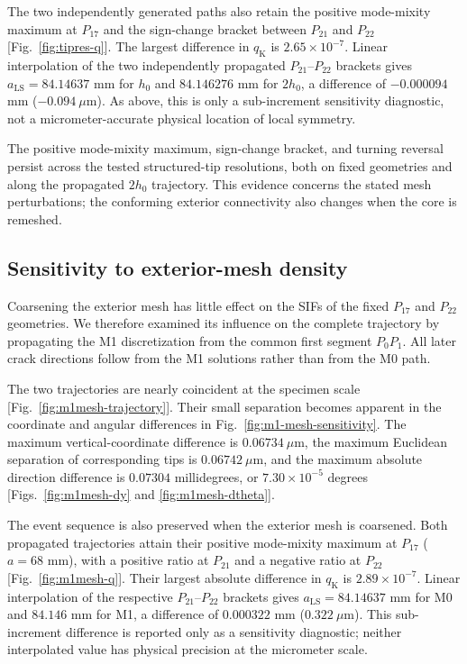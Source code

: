 \documentclass[11pt]{article}
\begin{document}
The two independently generated paths also retain the
positive mode-mixity maximum at $P_{17}$ and the sign-change
bracket between $P_{21}$ and $P_{22}$
[Fig.~\ref{fig:tipres-q}]. The largest difference
in $q_{\mathrm{K}}$ is $2.65\times10^{-7}$.
Linear interpolation of the two independently propagated
$P_{21}$--$P_{22}$ brackets gives
$a_{\mathrm{LS}}=84.14637$ mm for $h_0$ and
$84.146276$ mm for $2h_0$, a difference of
$-0.000094$ mm ($-0.094~\mu\mathrm{m}$). As above, this is only a
sub-increment sensitivity diagnostic, not a micrometer-accurate physical
location of local symmetry.

The positive mode-mixity maximum, sign-change bracket, and
turning reversal persist across the tested structured-tip
resolutions, both on fixed geometries and along the propagated
$2h_0$ trajectory. This evidence concerns the stated
mesh perturbations; the conforming exterior connectivity
also changes when the core is remeshed.

\subsection{Sensitivity to exterior-mesh density}
Coarsening the exterior mesh has little effect on the SIFs
of the fixed $P_{17}$ and $P_{22}$ geometries. We therefore
examined its influence on the complete trajectory by propagating
the M1 discretization from the common first segment $P_0P_1$.
All later crack directions follow from the M1 solutions
rather than from the M0 path.

The two trajectories are nearly coincident at the specimen scale
[Fig.~\ref{fig:m1mesh-trajectory}]. Their small separation becomes
apparent in the coordinate and angular differences in
Fig.~\ref{fig:m1-mesh-sensitivity}. The maximum vertical-coordinate
difference is $0.06734~\mu\mathrm{m}$, the maximum Euclidean separation of
corresponding tips is $0.06742~\mu\mathrm{m}$, and the maximum absolute direction
difference is $0.07304$ millidegrees, or $7.30\times10^{-5}$ degrees
[Figs.~\ref{fig:m1mesh-dy} and \ref{fig:m1mesh-dtheta}].

The event sequence is also preserved when the exterior
mesh is coarsened. Both propagated trajectories attain
their positive mode-mixity maximum at $P_{17}$
($a=68$ mm), with a positive ratio at $P_{21}$ and
a negative ratio at $P_{22}$ [Fig.~\ref{fig:m1mesh-q}].
Their largest absolute difference in $q_{\mathrm{K}}$
is $2.89\times10^{-7}$. Linear interpolation of
the respective $P_{21}$--$P_{22}$ brackets gives
$a_{\mathrm{LS}}=84.14637$ mm for M0 and
$84.146$ mm for M1, a difference of $0.000322$ mm
($0.322~\mu\mathrm{m}$). This sub-increment difference is reported only as a
sensitivity diagnostic; neither interpolated value has physical precision
at the micrometer scale.
\end{document}
